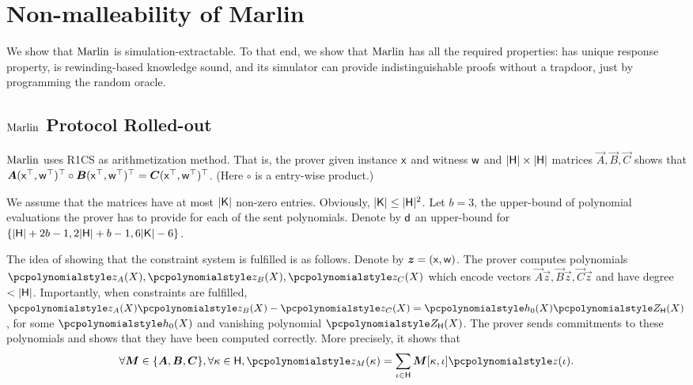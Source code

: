 
\section{Non-malleability of Marlin}
We show that ${\textnormal{{Marlin}}}$ is simulation-extractable. To that end, we show
that ${\textnormal{{Marlin}}}$ has all the required properties: has unique response property, is
rewinding-based knowledge sound, and its simulator can provide indistinguishable proofs
without a trapdoor, just by programming the random oracle.

\subsection{${\textnormal{{Marlin}}}$ Protocol Rolled-out}
${\textnormal{{Marlin}}}$ uses R1CS as arithmetization method. That is, the prover given
instance $\mathsf{x}$ and witness $\mathsf{w}$ and $|\mathsf{H}| \times |\mathsf{H}|$ matrices $\vec{A},
\vec{B}, \vec{C}$ shows that $\vec{A} (\inp^\top, \wit^\top)^\top \circ \vec{B}
(\inp^\top, \wit^\top)^\top = \vec{C} (\inp^\top, \wit^\top)^\top$. (Here
$\circ$ is a entry-wise product.)

We assume that the matrices have at most $|\mathsf{K}|$ non-zero entries. Obviously,
$|\mathsf{K}| \leq |\mathsf{H}|^2$. Let $b = 3$, the upper-bound of polynomial evaluations
the prover has to provide for each of the sent polynomials.  Denote by $\mathsf{d}$
an upper-bound for $\{|\mathsf{H}| + 2b -1, 2 |\mathsf{H}| + b - 1, 6 |\mathsf{K}| - 6\}$.

The idea of showing that the constraint system is fulfilled is as
follows. Denote by $\vec{z} = (\inp, \wit)$. The prover computes polynomials
$\p{z_A} (X), \p{z_B} (X), \p{z_C} (X)$ which encode vectors
$\vec{A} \vec{z}, \vec{B} \vec{z}, \vec{C} \vec{z}$ and have degree $<
|\mathsf{H}|$. Importantly, when constraints are fulfilled,
$ \p{z_A} (X) \p{z_B} (X) - \p{z_C} (X) = \p{h_0} (X) \ZERO_\HHH (X)$, for some
$\p{h_0} (X)$ and vanishing polynomial $\ZERO_\HHH (X)$. The prover sends
commitments to these polynomials and shows that they have been computed
correctly. More precisely, it shows that
\begin{equation}
  \label{eq:marlin_eq_2}
\forall \vec{M} \in \smallset{\vec{A}, \vec{B}, \vec{C}},  \forall \kappa \in \HHH,
\p{z_M} (\kappa) = \sum_{\iota \in \HHH} \vec{M}[\kappa, \iota] \p{z}(\iota).
\end{equation}

